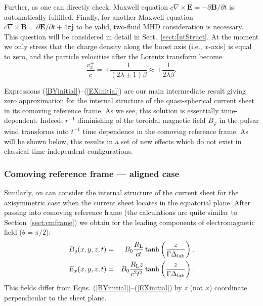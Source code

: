 \documentclass[useAMS,usenatbib]{mn2e}
\def\th{\theta}
\def\b{B_{L \rm} R_{L \rm}}
\begin{document}
Further, as one can directly check, Maxwell equation 
$c \nabla \times {\boldsymbol E} = - \partial {\boldsymbol B}/\partial t$ is automatically
fulfilled. Finally, for another Maxwell equation 
$c \nabla \times {\boldsymbol B} =  \partial {\boldsymbol E}/\partial t + 4 \pi {\boldsymbol j}$ to 
be valid, two-fluid MHD consideration is necessary. This question will be
considered in detail in Sect.~\ref{sect:IntStruct}. At the moment we only 
stress that the charge density along the boost axis (i.e., $x$-axis) is equal 
to zero, and the particle velocities after the Lorentz transform become
\begin{equation}
\frac{v_x^{\pm}}{c} = \mp \frac{1}{(2\lambda\pm 1) \beta}\approx \mp \frac{1}{2\lambda \beta}.
\end{equation}

Expressions (\ref{BYinitial})--(\ref{EXinitial}) are our main intermediate result 
giving zero approximation for the internal structure of the quasi-spherical 
current sheet in its comoving reference frame. As we see, this solution is
essentially time-dependent. Indeed, $r^{-1}$ diminishing of the toroidal 
magnetic field $B_{\varphi}$ in the pulsar wind transforms into $t^{-1}$ time
dependence in the comoving reference frame. As will be shown below, this results 
in a set of new effects which do not exist in classical time-independent
configurations.


\subsubsection{Comoving reference frame --- aligned case}
\label{sect:align}

Similarly, on can consider the internal structure of the current sheet for the
axisymmetric case when the current sheet locates in the equatorial plane. 
After passing into comoving reference frame (the calculations are quite similar 
to Section~\ref{sect:cmframe}) we obtain for the leading components of 
electromagnetic  field ($\theta = \pi/2$):
\begin{eqnarray}
B_{y}(x, y, z, t) & = & B_{0} \frac{R_{\rm L}}{ct} 
\tanh \left(\frac{z}{\Gamma \Delta_{\rm lab}} \right), \\
E_{x}(x, y, z, t) & = & B_{0} \frac{R_{\rm L}z}{c^2 t^2} 
\tanh \left(\frac{z}{\Gamma \Delta_{\rm lab}} \right).
\end{eqnarray}
This fields differ from Eqns. (\ref{BYinitial})--(\ref{EXinitial}) by $z$
(not $x$) coordinate perpendicular to the sheet plane. 
\end{document}
